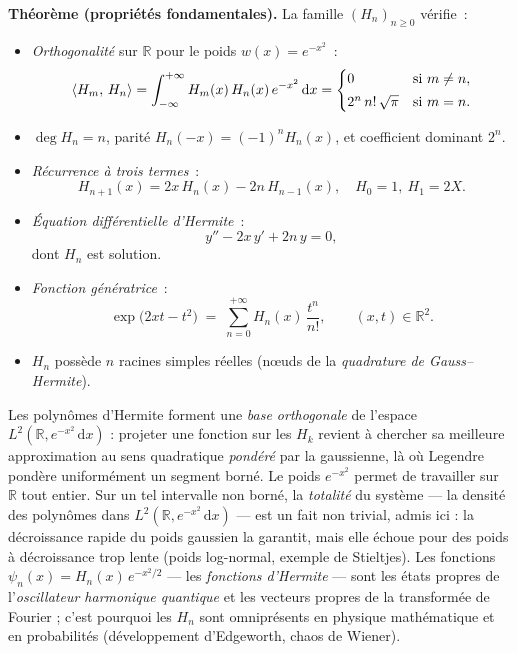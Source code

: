 \begin{tcolorbox}[thmbox]
  \medskip
  \textbf{Théorème (propriétés fondamentales).}\enspace%
  La famille ${(H_n)}_{n\geq 0}$ vérifie~:
  \begin{itemize}
    \item \textit{Orthogonalité} sur $\mathbb{R}$ pour le poids
    $w(x)=e^{-x^2}$~:
    \[
      \langle H_m,\,H_n\rangle = \int_{-\infty}^{+\infty} H_m(x)\,H_n(x)\,e^{-x^2}\,\mathrm{d}x
      = \begin{cases}
          0 & \text{si } m\neq n,\\[2pt]
          2^n\,n!\,\sqrt{\pi} & \text{si } m=n.
        \end{cases}
    \]
    \item $\deg H_n = n$, parité $H_n(-x)={(-1)}^n H_n(x)$, et
          coefficient dominant $2^n$.
    \item \textit{Récurrence à trois termes}~:
    \[
      H_{n+1}(x) = 2x\,H_n(x) - 2n\,H_{n-1}(x),
      \quad H_0=1,\ H_1=2X.
    \]
    \item \textit{Équation différentielle d'Hermite}~:
    \[
      y'' - 2x\,y' + 2n\,y = 0,
    \]
    dont $H_n$ est solution.
    \item \textit{Fonction génératrice}~:
    \[
      \exp\!\bigl(2xt-t^2\bigr) \;=\; \sum_{n=0}^{+\infty} H_n(x)\,\frac{t^n}{n!},
      \qquad (x,t)\in\mathbb{R}^2.
    \]
    \item $H_n$ possède $n$ racines simples réelles (nœuds de la
          \emph{quadrature de Gauss--Hermite}).
  \end{itemize}
\end{tcolorbox}

\begin{significationintuitive}
Les polynômes d'Hermite forment une \emph{base orthogonale} de l'espace
$L^2(\mathbb{R},e^{-x^2}\,\mathrm{d}x)$ : projeter une fonction sur les
$H_k$ revient à chercher sa meilleure approximation au sens quadratique
\emph{pondéré} par la gaussienne, là où Legendre pondère uniformément un
segment borné. Le poids $e^{-x^2}$ permet de travailler sur $\mathbb{R}$
tout entier. Sur un tel intervalle non borné, la \emph{totalité} du
système — la densité des polynômes dans
$L^2(\mathbb{R},e^{-x^2}\,\mathrm{d}x)$ — est un fait non trivial, admis
ici : la décroissance rapide du poids gaussien la garantit, mais elle
échoue pour des poids à décroissance trop lente (poids log-normal,
exemple de Stieltjes). Les fonctions $\psi_n(x)=H_n(x)\,e^{-x^2/2}$ — les
\emph{fonctions d'Hermite} — sont les états propres de
l'\emph{oscillateur harmonique quantique}
et les vecteurs propres de la transformée de Fourier ; c'est pourquoi
les $H_n$ sont omniprésents en physique mathématique et en probabilités
(développement d'Edgeworth, chaos de Wiener).
\end{significationintuitive}

